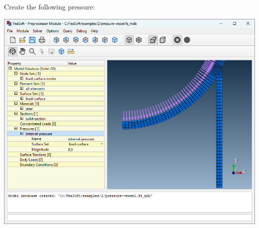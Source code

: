\documentclass[
    11pt,        %
    a4paper,     %
    final,       %
    fleqn,       %
    notitlepage, %
    onecolumn,   %
    oneside,     %
]{article}
\begin{document}
Create the following pressure:
\begin{center}
\end{center}
\begin{center}
    \includegraphics[scale=0.5]{fig/ui-2-7.png}
\end{center}
\end{document}
